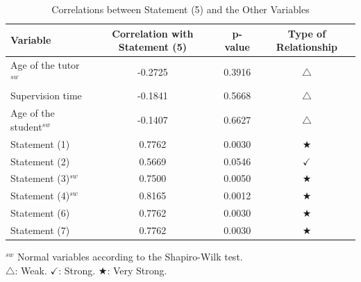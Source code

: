                 \begin{table}[h]
                    \centering
                    \caption{Correlations between Statement (5) and the Other Variables}
                    \begin{tabularx}{0.75\textwidth}{Xccc}
                        \toprule
                        \textbf{Variable} & \textbf{Correlation with Statement (5)} & \textbf{p-value} & \textbf{Type of Relationship} \\
                        \midrule
                        Age of the tutor$^{sw}$ & -0.2725 & 0.3916 & \(\bigtriangleup\) \\ %
                        Supervision time & -0.1841 & 0.5668 & \(\bigtriangleup\) \\ %
                        Age of the student$^{sw}$ & -0.1407 & 0.6627 & \(\bigtriangleup\) \\ %
                        Statement (1) & 0.7762 & 0.0030 & \(\bigstar\) \\ %
                        Statement (2) & 0.5669 & 0.0546 & \(\checkmark\) \\ %
                        Statement (3)$^{sw}$ & 0.7500 & 0.0050 & \(\bigstar\) \\ %
                        Statement (4)$^{sw}$ & 0.8165 & 0.0012 & \(\bigstar\) \\ %
                        Statement (6) & 0.7762 & 0.0030 & \(\bigstar\) \\ %
                        Statement (7) & 0.7762 & 0.0030 & \(\bigstar\) \\ %
                        \bottomrule
                    \end{tabularx}
                    \label{table:Pearson-Correlation}
                    \vspace{0.3em} %
                    \parbox{0.75\textwidth}{\footnotesize
                        $^{sw}$ Normal variables according to the Shapiro-Wilk test.\\
                        \(\bigtriangleup\): Weak. \(\checkmark\): Strong. \(\bigstar\): Very Strong.
                    }
                \end{table}
                
